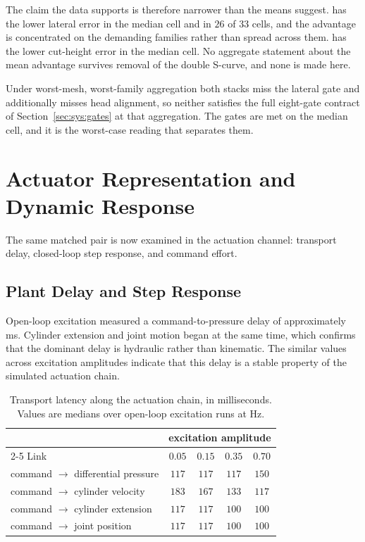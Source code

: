 The claim the data supports is therefore narrower than the means suggest.
\ppoIDFD{} has the lower lateral error in the median cell and in $26$ of $33$
cells, and the advantage is concentrated on the demanding families rather than
spread across them. \ppoROM{} has the lower cut-height error in the median cell.
No aggregate statement about the mean advantage survives removal of the double
S-curve, and none is made here.

Under worst-mesh, worst-family aggregation both stacks miss the lateral gate and
\ppoIDFD{} additionally misses head alignment, so neither satisfies the full
eight-gate contract of Section~\ref{sec:sys:gates} at that aggregation. The
gates are met on the median cell, and it is the worst-case reading that
separates them.

\section{Actuator Representation and Dynamic Response}
\label{sec:eval:delay}

The same matched pair is now examined in the actuation channel: transport
delay, closed-loop step response, and command effort.

\subsection{Plant Delay and Step Response}
\label{sec:eval:delay-plant}

Open-loop excitation measured a command-to-pressure delay of approximately
\unit[117]{ms}. Cylinder extension and joint motion began at the same time,
which confirms that the dominant delay is hydraulic rather than kinematic. The
similar values across excitation amplitudes indicate that this delay is a stable
property of the simulated actuation chain.

\begin{table}[tbp]
  \centering
  \caption{Transport latency along the actuation chain, in milliseconds.
  Values are medians over open-loop excitation runs at \unit[60]{Hz}.}
  \label{tab:eval:delay}
  \begin{tabular}{lcccc}
    \toprule
    & \multicolumn{4}{c}{excitation amplitude} \\
    \cmidrule(lr){2-5}
    Link & $0.05$ & $0.15$ & $0.35$ & $0.70$ \\
    \midrule
    command $\rightarrow$ differential pressure & $117$ & $117$ & $117$ & $150$ \\
    command $\rightarrow$ cylinder velocity & $183$ & $167$ & $133$ & $117$ \\
    command $\rightarrow$ cylinder extension & $117$ & $117$ & $100$ & $100$ \\
    command $\rightarrow$ joint position & $117$ & $117$ & $100$ & $100$ \\
    \bottomrule
  \end{tabular}
\end{table}

